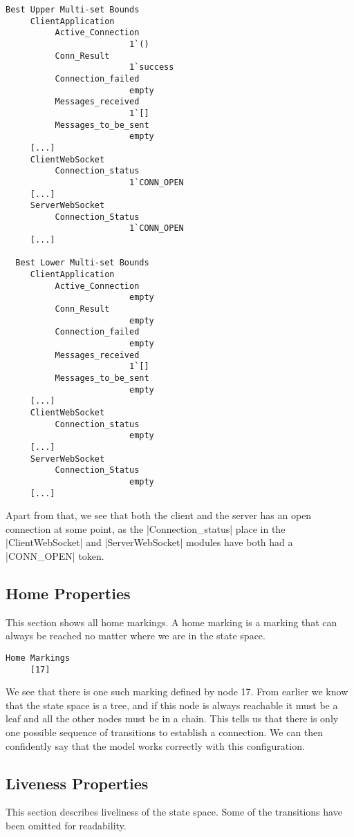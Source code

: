 	\begin{lstlisting}[language={}]
  Best Upper Multi-set Bounds
     ClientApplication
          Active_Connection
                         1`()
          Conn_Result
                         1`success
          Connection_failed
                         empty
          Messages_received
                         1`[]
          Messages_to_be_sent
                         empty
     [...]
     ClientWebSocket
          Connection_status
                         1`CONN_OPEN
     [...]
     ServerWebSocket
          Connection_Status
                         1`CONN_OPEN
     [...]

  Best Lower Multi-set Bounds
     ClientApplication
          Active_Connection
                         empty
          Conn_Result
                         empty
          Connection_failed
                         empty
          Messages_received
                         1`[]
          Messages_to_be_sent
                         empty
     [...]
     ClientWebSocket
          Connection_status
                         empty
     [...]
     ServerWebSocket
          Connection_Status
                         empty
     [...]
	\end{lstlisting}
	
	Apart from that, we see that both the client and the server has an open
	connection at some point, as the |Connection_status| place in the
	|ClientWebSocket| and |ServerWebSocket| modules have both had a |CONN_OPEN|
	token.
	
	\subsection{Home Properties}
	This section shows all home markings. A home marking is a marking that can
	always be reached no matter where we are in the state space. 
	\begin{lstlisting}[language={}]
  Home Markings
     [17]
	\end{lstlisting}
	We see that there is one such marking defined by node 17. From earlier we know
	that the state space is a tree, and if this node is always reachable it must be a leaf
	and all the other nodes must be in a chain. This tells us that there is only
	one possible sequence of transitions to establish a connection. We can then
	confidently say that the model works correctly with this configuration.
	
	\subsection{Liveness Properties}
	This section describes liveliness of the state space. Some of the transitions
	have been omitted for readability.
	
